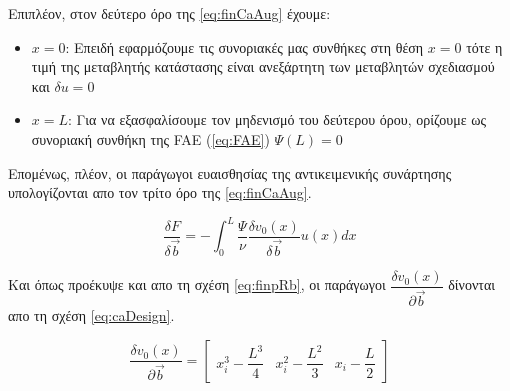 Επιπλέον, στον δεύτερο όρο της \ref{eq:finCaAug} έχουμε:

\begin{itemize}
    \item $x=0$: Επειδή εφαρμόζουμε τις συνοριακές μας συνθήκες στη θέση $x=0$ τότε η τιμή της μεταβλητής κατάστασης είναι ανεξάρτητη των μεταβλητών σχεδιασμού και $\delta u = 0$
    \item $x=L$: Για να εξασφαλίσουμε τον μηδενισμό του δεύτερου όρου, ορίζουμε ως συνοριακή συνθήκη της FAE (\ref{eq:FAE}) $\Psi(L)=0$
\end{itemize}

Επομένως, πλέον, οι παράγωγοι ευαισθησίας της αντικειμενικής συνάρτησης υπολογίζονται απο τον τρίτο όρο της \ref{eq:finCaAug}.


\begin{equation}
    \dfrac{\delta F}{\delta \vec{b}} = - \int_0^L\dfrac{\Psi}{\nu}\dfrac{\delta v_0(x)}{\delta \vec{b}}u(x)dx 
    \label{eq:CAsens}
\end{equation}

Και όπως προέκυψε και απο τη σχέση \ref{eq:finpRb}, οι παράγωγοι $\dfrac{\delta v_0(x)}{\partial \vec{b}}$ δίνονται απο τη σχέση \ref{eq:caDesign}.  

\begin{equation}
    \dfrac{\delta v_0(x)}{\partial \vec{b}} = 
    \begin{bmatrix}
        x_i^3 - \dfrac{L^3}{4} & x_i^2 - \dfrac{L^2}{3} & x_i - \dfrac{L}{2}
    \end{bmatrix}
\label{eq:caDesign}
\end{equation}

